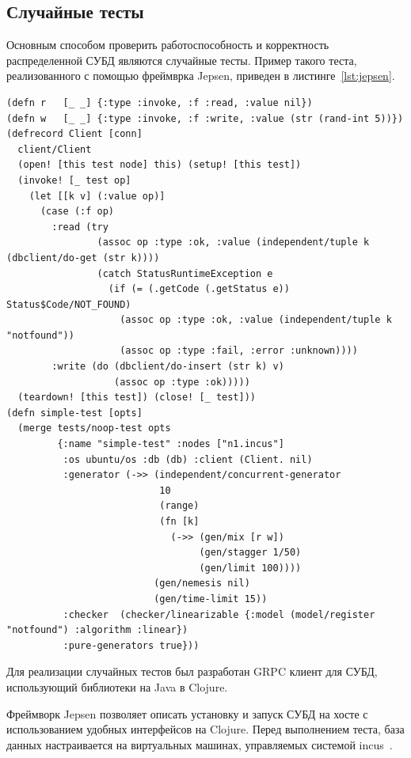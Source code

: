 \documentclass[14pt, russian]{scrartcl}
\begin{document}
\subsection{Случайные тесты}

Основным способом проверить работоспособность и корректность распределенной СУБД
являются случайные тесты. Пример такого теста, реализованного с помощью
фреймврка Jepsen, приведен в листинге~\ref{lst:jepsen}.

\begin{listing}[H]
  \caption{Определение теста в Jepsen.}
  \label{lst:jepsen}
  \begin{verbatim}
(defn r   [_ _] {:type :invoke, :f :read, :value nil})
(defn w   [_ _] {:type :invoke, :f :write, :value (str (rand-int 5))})
(defrecord Client [conn]
  client/Client
  (open! [this test node] this) (setup! [this test])
  (invoke! [_ test op]
    (let [[k v] (:value op)]
      (case (:f op)
        :read (try
                (assoc op :type :ok, :value (independent/tuple k (dbclient/do-get (str k))))
                (catch StatusRuntimeException e
                  (if (= (.getCode (.getStatus e)) Status$Code/NOT_FOUND)
                    (assoc op :type :ok, :value (independent/tuple k "notfound"))
                    (assoc op :type :fail, :error :unknown))))
        :write (do (dbclient/do-insert (str k) v)
                   (assoc op :type :ok)))))
  (teardown! [this test]) (close! [_ test]))
(defn simple-test [opts]
  (merge tests/noop-test opts
         {:name "simple-test" :nodes ["n1.incus"]
          :os ubuntu/os :db (db) :client (Client. nil)
          :generator (->> (independent/concurrent-generator
                           10
                           (range)
                           (fn [k]
                             (->> (gen/mix [r w])
                                  (gen/stagger 1/50)
                                  (gen/limit 100))))
                          (gen/nemesis nil)
                          (gen/time-limit 15))
          :checker  (checker/linearizable {:model (model/register "notfound") :algorithm :linear})
          :pure-generators true}))
  \end{verbatim}
\end{listing}

Для реализации случайных тестов был разработан GRPC клиент для СУБД,
использующий библиотеки на Java в Clojure.

Фреймворк Jepsen позволяет описать установку и запуск СУБД на хосте с
использованием удобных интерфейсов на Clojure. Перед выполнением теста, база
данных настраивается на виртуальных машинах, управляемых системой
incus~\cite{incus}.
\end{document}
